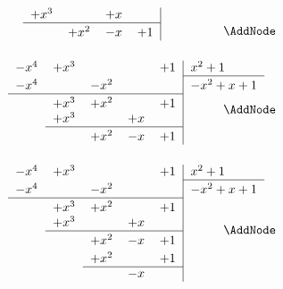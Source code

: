 \begin{esempio}
\begin{NodesList}
\begin{align*}
\begin{minipage}[t]{0.5\textwidth}
\begin{tabular}{lllll|l}
 &$+x^3$& &$+x$&&  \\ 
\cline{2-5}
   \vrule height 2.5ex width 0pt&  &$+x^2$&$-x$&$+1$&  \\ 
\\
\end{tabular}
\end{minipage}&\AddNode\\
\begin{minipage}[t]{0.5\textwidth}
\begin{tabular}{lllll|l}
$-x^4$& $+x^3$ & \phantom{$-x^2$} & \phantom{$-x$} &$+1$&$ x^2+1$\\ 
\cline{6-6}
  \vrule height 2.5ex width 0pt $-x^4$& &$-x^2$  &  &&$-x^2+x+1$\\ 
\cline{1-5}
  \vrule height 2.5ex width 0pt &$+x^3$ & $+x^2$ &  &$+1$&  \\ 
 &$+x^3$& &$+x$&&  \\ 
\cline{2-5}
   \vrule height 2.5ex width 0pt&  &$+x^2$&$-x$&$+1$&  \\ 
\\
\end{tabular}
\end{minipage}&\AddNode\\
\begin{minipage}[t]{0.5\textwidth}
\begin{tabular}{lllll|l}
$-x^4$& $+x^3$ & \phantom{$-x^2$} & \phantom{$-x$} &$+1$&$ x^2+1$\\ 
\cline{6-6}
  \vrule height 2.5ex width 0pt $-x^4$& &$-x^2$  &  &&$-x^2+x+1$\\ 
\cline{1-5}
  \vrule height 2.5ex width 0pt &$+x^3$ & $+x^2$ &  &$+1$&  \\ 
 &$+x^3$& &$+x$&&  \\ 
\cline{2-5}
   \vrule height 2.5ex width 0pt&  &$+x^2$&$-x$&$+1$&  \\ 
   \vrule height 2.5ex width 0pt&  &$+x^2$&&$+1$&  \\ 
\cline{3-5}
 &  &  &$-x$&&  \\ 
\\
\end{tabular}
\end{minipage}&\AddNode\\
\end{align*}
\LinkNodes{\begin{minipage}{3.5cm}


\end{minipage}}
\end{NodesList}
\end{esempio}
